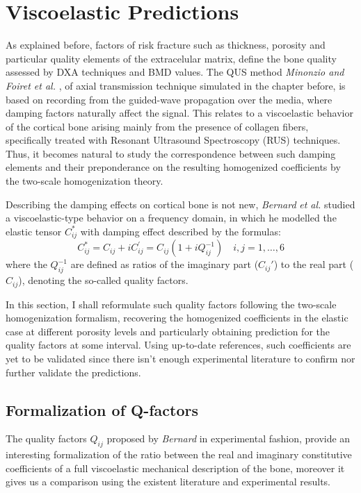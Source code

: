 \chapter{Viscoelastic Predictions}
As explained before, factors of risk fracture such as thickness, porosity and particular quality elements of the extracelular matrix, define the bone quality assessed by DXA techniques and BMD values. The QUS method \textit{Minonzio and Foiret et al.} \cite{Foiret2014}, \cite{Minonzio2018} of axial transmission technique simulated in the chapter before, is based on recording from the guided-wave propagation over the media, where damping factors naturally affect the signal. This relates to a viscoelastic behavior of the cortical bone arising mainly from the presence of collagen fibers, specifically treated with Resonant Ultrasound Spectroscopy (RUS) techniques. Thus, it becomes natural to study the correspondence between such damping elements and their preponderance on the resulting homogenized coefficients by the two-scale homogenization theory.

Describing the damping effects on cortical bone is not new, \textit{Bernard} \textit{et al. }\cite{Bernard2015} studied a viscoelastic-type behavior on a frequency domain, in which he modelled the elastic tensor $C^*_{ij}$ with damping effect described by the formulas:
\begin{equation*}
C^*_{ij} = C_{ij} + i C_{ij}^{'} = C_{ij} (1+ iQ_{ij}^{-1}) \quad i,j = 1,\dots, 6
\end{equation*}
where the $Q^{-1}_{ij}$ are defined as ratios of the imaginary part ($C_{ij}'$) to the real part ($C_{ij}$), denoting the so-called quality factors.

In this section, I shall reformulate such quality factors following the two-scale homogenization formalism, recovering the homogenized coefficients in the elastic case at different porosity levels and particularly obtaining prediction for the quality factors at some interval. Using up-to-date references, such coefficients are yet to be validated since there isn't enough experimental literature to confirm nor further validate the predictions.

\section{Formalization of Q-factors}
The quality factors $Q_{ij}$ proposed by \textit{Bernard} in experimental fashion, provide an interesting formalization of the ratio between the real and imaginary constitutive coefficients of a full viscoelastic mechanical description of the bone, moreover it gives us a comparison using the existent literature and experimental results.


